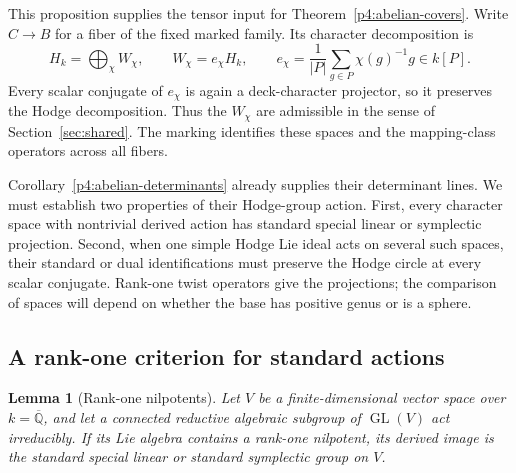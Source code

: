 \documentclass[11pt]{article}
\newcommand{\Qbar}{\overline{\mathbb Q}}
\theoremstyle{plain}
\newtheorem{lemma}[theorem]{Lemma}
\theoremstyle{definition}
\theoremstyle{remark}
\numberwithin{equation}{section}
\begin{document}
This proposition supplies the tensor input for
Theorem~\ref{p4:abelian-covers}.  Write $C\to B$ for a fiber of the
fixed marked family.  Its character decomposition is
\[
 H_k=\bigoplus_\chi W_\chi,\qquad
 W_\chi=e_\chi H_k,\qquad
 e_\chi=\frac1{|P|}\sum_{g\in P}\chi(g)^{-1}g\in k[P].
\]
Every scalar conjugate of $e_\chi$ is again a deck-character projector,
so it preserves the Hodge decomposition.  Thus the $W_\chi$ are
admissible in the sense of Section~\ref{sec:shared}.  The marking
identifies these spaces and the mapping-class operators across all fibers.

Corollary~\ref{p4:abelian-determinants} already supplies their
determinant lines.  We must establish two properties of their
Hodge-group action.  First, every character space with nontrivial
derived action has standard special linear or symplectic projection.
Second, when one simple Hodge Lie ideal acts on several such spaces,
their standard or dual identifications must preserve the Hodge circle
at every scalar conjugate.  Rank-one twist operators give the
projections; the comparison of spaces will depend on whether the base
has positive genus or is a sphere.

\subsection{A rank-one criterion for standard actions}

\begin{lemma}[Rank-one nilpotents]\label{p4:cover-rank-one}
Let $V$ be a finite-dimensional vector space over $k=\Qbar$, and let a
connected reductive algebraic
subgroup of $\operatorname{GL}(V)$ act irreducibly.  If its Lie algebra contains a
rank-one nilpotent, its derived image is the standard special linear or
standard symplectic group on $V$.
\end{lemma}
\end{document}
